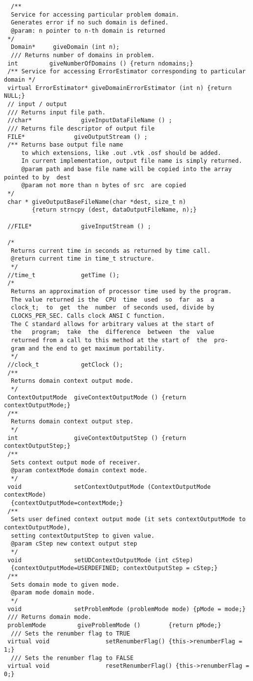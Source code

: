 \documentclass[12pt,draft]{article}
\begin{document}
{\begin{verbatim}
  /**
  Service for accessing particular problem domain.
  Generates error if no such domain is defined.
  @param: n pointer to n-th domain is returned
 */
  Domain*     giveDomain (int n);
  /// Returns number of domains in problem.
 int         giveNumberOfDomains () {return ndomains;}
 /** Service for accessing ErrorEstimator corresponding to particular domain */
 virtual ErrorEstimator* giveDomainErrorEstimator (int n) {return NULL;}
 // input / output
 /// Returns input file path.
 //char*              giveInputDataFileName () ;
 /// Returns file descriptor of output file
 FILE*              giveOutputStream () ;
 /** Returns base output file name
     to which extensions, like .out .vtk .osf should be added.
     In current implementation, output file name is simply returned.
     @param path and base file name will be copied into the array pointed to by  dest
     @param not more than n bytes of src  are copied
 */
 char * giveOutputBaseFileName(char *dest, size_t n) 
        {return strncpy (dest, dataOutputFileName, n);}

 //FILE*              giveInputStream () ;
  
 /*
  Returns current time in seconds as returned by time call.
  @return current time in time_t structure.
  */
 //time_t             getTime ();
 /*
  Returns an approximation of processor time used by the program.
  The value returned is the  CPU  time  used  so  far  as  a
  clock_t;  to  get  the  number  of seconds used, divide by
  CLOCKS_PER_SEC. Calls clock ANSI C function.
  The C standard allows for arbitrary values at the start of
  the   program;  take  the  difference  between  the  value
  returned from a call to this method at the start of  the  pro-
  gram and the end to get maximum portability.
  */
 //clock_t            getClock ();
 /**
  Returns domain context output mode.
  */
 ContextOutputMode  giveContextOutputMode () {return contextOutputMode;}
 /**
  Returns domain context output step.
  */
 int                giveContextOutputStep () {return contextOutputStep;}
 /**
  Sets context output mode of receiver.
  @param contextMode domain context mode.
  */
 void               setContextOutputMode (ContextOutputMode contextMode) 
  {contextOutputMode=contextMode;}
 /**
  Sets user defined context output mode (it sets contextOutputMode to contextOutputMode), 
  setting contextOutputStep to given value.
  @param cStep new context output step
  */
 void               setUDContextOutputMode (int cStep)
  {contextOutputMode=USERDEFINED; contextOutputStep = cStep;}
 /**
  Sets domain mode to given mode.
  @param mode domain mode.
  */
 void               setProblemMode (problemMode mode) {pMode = mode;}
 /// Returns domain mode.
 problemMode         giveProblemMode ()        {return pMode;}
  /// Sets the renumber flag to TRUE
 virtual void                setRenumberFlag() {this->renumberFlag = 1;}
  /// Sets the renumber flag to FALSE
 virtual void                resetRenumberFlag() {this->renumberFlag = 0;}


\end{verbatim}}
\end{document}
